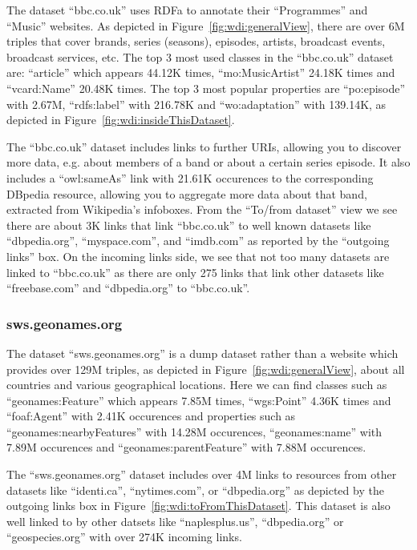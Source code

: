The dataset ``bbc.co.uk'' uses RDFa to annotate their ``Programmes'' and ``Music'' websites. As depicted in Figure~\ref{fig:wdi:generalView}, there are over 6M triples that cover brands, series (seasons), episodes, artists, broadcast events, broadcast services, etc. The top 3 most used classes in the ``bbc.co.uk'' dataset are: ``article'' which appears 44.12K times, ``mo:MusicArtist'' 24.18K times and ``vcard:Name'' 20.48K times. The top 3 most popular properties are ``po:episode'' with 2.67M, ``rdfs:label'' with 216.78K and ``wo:adaptation'' with 139.14K, as depicted in Figure~\ref{fig:wdi:insideThisDataset}.

The ``bbc.co.uk'' dataset includes links to further URIs, allowing you to discover more data, e.g. about members of a band or about a certain series episode. It also includes a ``owl:sameAs'' link with 21.61K occurences to the corresponding DBpedia resource, allowing you to aggregate more data about that band, extracted from Wikipedia's infoboxes. From the ``To/from dataset'' view we see there are about 3K links that link ``bbc.co.uk'' to well known datasets like ``dbpedia.org'', ``myspace.com'', and ``imdb.com'' as reported by the ``outgoing links'' box. On the incoming links side, we see that not too many datasets are linked to ``bbc.co.uk'' as there are only 275 links that link other datasets like ``freebase.com'' and ``dbpedia.org'' to ``bbc.co.uk''.

\subsubsection{sws.geonames.org}

The dataset ``sws.geonames.org'' is a dump dataset rather than a website which provides over 129M triples, as depicted in Figure~\ref{fig:wdi:generalView}, about all countries and various geographical locations. Here we can find classes such as ``geonames:Feature'' which appears 7.85M times, ``wgs:Point'' 4.36K times and ``foaf:Agent'' with 2.41K occurences and properties such as ``geonames:nearbyFeatures'' with 14.28M occurences, ``geonames:name'' with 7.89M occurences and ``geonames:parentFeature'' with 7.88M occurences.

The ``sws.geonames.org'' dataset includes over 4M links to resources from other datasets like ``identi.ca'', ``nytimes.com'', or ``dbpedia.org'' as depicted by the outgoing links box in Figure~\ref{fig:wdi:toFromThisDataset}. This dataset is also well linked to by other datsets like ``naplesplus.us'', ``dbpedia.org'' or ``geospecies.org'' with over 274K incoming links.

